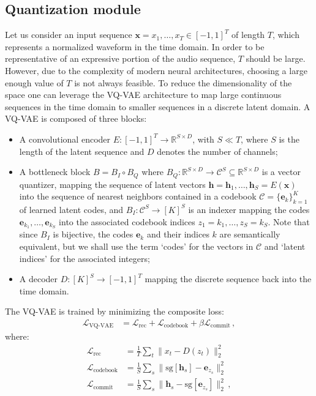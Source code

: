 \documentclass[a4paper]{article}
\begin{document}
\subsection{Quantization module}
Let us consider an input sequence $\mathbf{x} = x_1, \dots, x_T \in [-1,1]^T$  of length $T$, which represents a normalized waveform in the time domain. In order to be representative of an expressive portion of the audio sequence, $T$ should be large. However, due to the complexity of modern neural architectures, choosing a large enough value of $T$ is not always feasible. To reduce the dimensionality of the space one can leverage the VQ-VAE architecture \cite{oord2017} to map large continuous sequences in the time domain to smaller sequences in a discrete latent domain. A VQ-VAE is composed of three blocks: 
\begin{itemize}
    \item A convolutional encoder $E: [-1, 1]^T \to \mathbb{R}^{S\times D}$, with $S \ll T$, where $S$ is the  length of the latent sequence and $D$ denotes the number of channels;
    \item A bottleneck block $B=B_I \circ B_Q$ where  $B_Q: \mathbb{R}^{S\times D} \to \mathcal{C}^S \subseteq \mathbb{R}^{S \times D}$ is a vector quantizer, mapping the sequence of latent vectors $\mathbf{h}= \mathbf{h}_1, \dots, \mathbf{h}_S=E(\mathbf{x})$ into the sequence of nearest neighbors contained in a codebook $\mathcal{C} = \{\mathbf{e}_k\}^K_{k=1}$ of learned latent codes, and $B_I: \mathcal{C}^S \to [K]^S$ is an indexer mapping the codes $\mathbf{e}_{k_1}, \dots, \mathbf{e}_{k_S}$ into the associated codebook indices $z_1 = k_1, \dots, z_S = k_S$. Note that since $B_I$ is bijective, the codes $\mathbf{e}_k$ and their indices $k$ are semantically equivalent, but we shall use the term `codes' for the vectors in $\mathcal{C}$ and `latent indices' for the associated integers;
    \item A decoder $D:[K]^S \to [-1,1]^T$ mapping the discrete sequence back into the time domain.
\end{itemize}
The VQ-VAE is trained by minimizing the composite loss:
\begin{align}\label{eq:loss_vqvae}
\mathcal{L}_{\text{VQ-VAE}} &= \mathcal{L}_{\text{rec}} + \mathcal{L}_{\text{codebook}} + \beta \mathcal{L}_{\text{commit}}\,, \end{align} where:
\begin{align}
 \mathcal{L}_{\text{rec}} &= \frac{1}{T} \sum_{t}{\lVert x_t - D({z_t})\rVert^2_2} \\
 \mathcal{L}_{\text{codebook}} &= \frac{1}{S} \sum_{s}{\lVert \text{sg}[\mathbf{h}_s] - \mathbf{e}_{z_s}\rVert^2_2} \\
 \mathcal{L}_{\text{commit}} &= \frac{1}{S} \sum_{s}{\lVert \mathbf{h}_s - \text{sg}[\mathbf{e}_{z_s}]\rVert^2_2}\,, \end{align}
\end{document}
